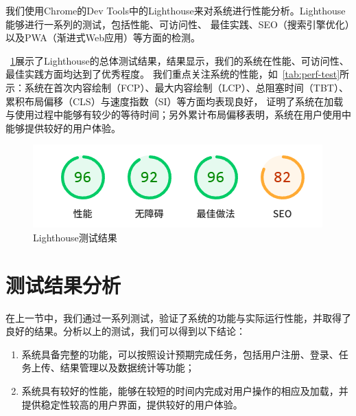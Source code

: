我们使用Chrome的Dev Tools中的Lighthouse来对系统进行性能分析。Lighthouse能够进行一系列的测试，包括性能、可访问性、
最佳实践、SEO（搜索引擎优化）以及PWA（渐进式Web应用）等方面的检测。

~\ref{fig:lighthouse}展示了Lighthouse的总体测试结果，结果显示，我们的系统在性能、可访问性、最佳实践方面均达到了优秀程度。
我们重点关注系统的性能，如~\ref{tab:perf-test}所示：系统在首次内容绘制（FCP）、最大内容绘制（LCP）、总阻塞时间（TBT）、累积布局偏移（CLS）与速度指数（SI）等方面均表现良好，
证明了系统在加载与使用过程中能够有较少的等待时间；另外累计布局偏移表明，系统在用户使用中能够提供较好的用户体验。

\begin{figure}
    \centering
    \includegraphics[width=0.6\linewidth]{source/img/lighthouse_general.png}
    \caption{Lighthouse测试结果}
    \label{fig:lighthouse}
\end{figure}

\begin{table}
    \centering
    \caption{性能测试}
    \label{tab:perf-test}
\end{table}

\section{测试结果分析}

在上一节中，我们通过一系列测试，验证了系统的功能与实际运行性能，并取得了良好的结果。分析以上的测试，我们可以得到以下结论：
\begin{enumerate}
    \item 系统具备完整的功能，可以按照设计预期完成任务，包括用户注册、登录、任务上传、结果管理以及数据统计等功能；
    \item 系统具有较好的性能，能够在较短的时间内完成对用户操作的相应及加载，并提供稳定性较高的用户界面，提供较好的用户体验。
\end{enumerate}